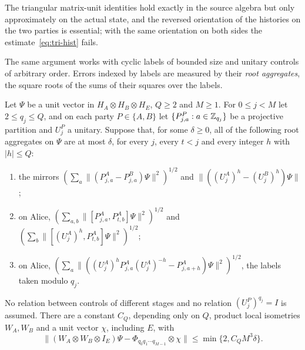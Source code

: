 The triangular matrix-unit identities hold exactly in the source algebra but only approximately on the actual state, and
the reversed orientation of the histories on the two parties is essential; with the same orientation on both sides the
estimate~\eqref{eq:tri-hist} fails.

The same argument works with cyclic labels of bounded size and unitary controls of arbitrary order. Errors indexed by labels are
measured by their \emph{root aggregates}, the square roots of the sums of their squares over the labels.

\begin{lemma}\label{lem:cyclic-triangular}
Let $\Psi$ be a unit vector in $H_A\otimes H_B\otimes H_E$, $Q\ge2$ and $M\ge1$. For $0\le j<M$ let $2\le q_j\le Q$, and on each party
$P\in\{A,B\}$ let $\{P^P_{j,a}:a\in\mathbb Z_{q_j}\}$ be a projective partition and $U^P_j$ a unitary. Suppose that, for some $\delta\ge0$, all
of the following root aggregates on $\Psi$ are at most $\delta$, for every $j$, every $t<j$ and every integer $h$ with $|h|\le Q$:
\begin{enumerate}[label=(\roman*),itemsep=1pt]
\item the mirrors $(\sum_a\|(P^A_{j,a}-P^B_{j,a})\Psi\|^2)^{1/2}$ and $\|((U^A_j)^h-(U^B_j)^h)\Psi\|$;
\item on Alice, $(\sum_{a,b}\|[P^A_{j,a},P^A_{t,b}]\Psi\|^2)^{1/2}$ and $(\sum_b\|[(U^A_j)^h,P^A_{t,b}]\Psi\|^2)^{1/2}$;
\item on Alice, $(\sum_a\|((U^A_j)^hP^A_{j,a}(U^A_j)^{-h}-P^A_{j,a+h})\Psi\|^2)^{1/2}$, the labels taken modulo $q_j$.
\end{enumerate}
No relation between controls of different stages and no relation $(U^P_j)^{q_j}=I$ is assumed. There are a constant $C_Q$, depending
only on $Q$, product local isometries $W_A,W_B$ and a unit vector $\chi$, including $E$, with
\[
\|(W_A\otimes W_B\otimes I_E)\Psi-\Phi_{q_0q_1\cdots q_{M-1}}\otimes\chi\|\le\min\{2,C_QM^3\delta\}.
\]
\end{lemma}

